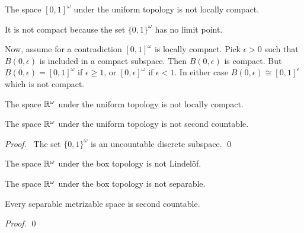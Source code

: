 \begin{example}
    The space $[0,1]^\omega$ under the uniform topology is not locally compact.

    It is not compact because the set $\{ 0,1 \}^\omega$ has no limit point.

    Now, assume for a contradiction $[0,1]^\omega$ is locally compact. Pick $\epsilon > 0$
    such that $B(0,\epsilon)$ is included in a compact subspace. Then $\overline{B(0,\epsilon)}$ is compact.
    But $\overline{B(0,\epsilon)} = [0,1]^\omega$ if $\epsilon \geq 1$, or $[0,\epsilon]^\omega$
    if $\epsilon < 1$. In either case $\overline{B(0,\epsilon)} \cong [0,1]^\epsilon$ which is not
    compact.
\end{example}

\begin{corollary}
    The space $\mathbb{R}^\omega$ under the uniform topology is not locally compact.
\end{corollary}

\begin{example}
    The space $\mathbb{R}^\omega$ under the uniform topology is not second countable.

    \begin{proof}
        \pf\ The set $\{0,1\}^\omega$ is an uncountable discrete subspace. \qed
    \end{proof}
\end{example}

\begin{corollary}
    The space $\mathbb{R}^\omega$ under the box topology is not Lindel\"{o}f.
\end{corollary}

\begin{corollary}
    The space $\mathbb{R}^\omega$ under the box topology is not separable.
\end{corollary}

\begin{proposition}
    Every separable metrizable space is second countable.
\end{proposition}

\begin{proof}
    \pf
    \qed
\end{proof}

